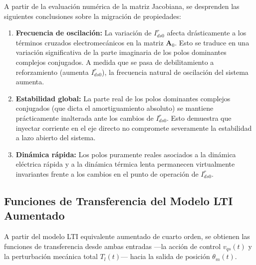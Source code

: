 \documentclass[12pt, a4paper,journal, onecolumn, compsoc]{IEEEtran}
\begin{document}
A partir de la evaluación numérica de la matriz Jacobiana, se desprenden las siguientes conclusiones sobre la migración de propiedades:
\begin{enumerate}
    \item \textbf{Frecuencia de oscilación:} La variación de $I_{ds0}^r$ afecta drásticamente a los términos cruzados electromecánicos en la matriz $\mathbf{A}_0$. Esto se traduce en una variación significativa de la parte imaginaria de los polos dominantes complejos conjugados. A medida que se pasa de debilitamiento a reforzamiento (aumenta $I_{ds0}^r$), la frecuencia natural de oscilación del sistema aumenta.
    \item \textbf{Estabilidad global:} La parte real de los polos dominantes complejos conjugados (que dicta el amortiguamiento absoluto) se mantiene prácticamente inalterada ante los cambios de $I_{ds0}^r$. Esto demuestra que inyectar corriente en el eje directo no compromete severamente la estabilidad a lazo abierto del sistema.
    \item \textbf{Dinámica rápida:} Los polos puramente reales asociados a la dinámica eléctrica rápida y a la dinámica térmica lenta permanecen virtualmente invariantes frente a los cambios en el punto de operación de $I_{ds0}^r$.
\end{enumerate}

\subsection{Funciones de Transferencia del Modelo LTI Aumentado}
A partir del modelo LTI equivalente aumentado de cuarto orden, se obtienen las funciones de transferencia desde ambas entradas ---la acción de control $v_{qs}(t)$ y la perturbación mecánica total $T_l(t)$--- hacia la salida de posición $\theta_m(t)$.
\end{document}
